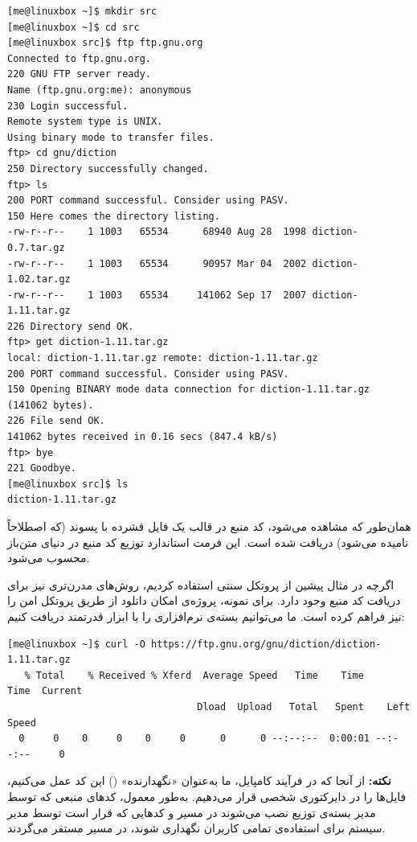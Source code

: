\begin{latin}
\begin{lstlisting}
[me@linuxbox ~]$ mkdir src
[me@linuxbox ~]$ cd src
[me@linuxbox src]$ ftp ftp.gnu.org
Connected to ftp.gnu.org.
220 GNU FTP server ready.
Name (ftp.gnu.org:me): anonymous
230 Login successful.
Remote system type is UNIX.
Using binary mode to transfer files.
ftp> cd gnu/diction
250 Directory successfully changed.
ftp> ls
200 PORT command successful. Consider using PASV.
150 Here comes the directory listing.
-rw-r--r--    1 1003   65534      68940 Aug 28  1998 diction-0.7.tar.gz
-rw-r--r--    1 1003   65534      90957 Mar 04  2002 diction-1.02.tar.gz
-rw-r--r--    1 1003   65534     141062 Sep 17  2007 diction-1.11.tar.gz
226 Directory send OK.
ftp> get diction-1.11.tar.gz
local: diction-1.11.tar.gz remote: diction-1.11.tar.gz
200 PORT command successful. Consider using PASV.
150 Opening BINARY mode data connection for diction-1.11.tar.gz (141062 bytes).
226 File send OK.
141062 bytes received in 0.16 secs (847.4 kB/s)
ftp> bye
221 Goodbye.
[me@linuxbox src]$ ls
diction-1.11.tar.gz
\end{lstlisting}
\end{latin}

همان‌طور که مشاهده می‌شود، کد منبع در قالب یک فایل فشرده با پسوند  (که اصطلاحاً  نامیده می‌شود) دریافت شده است. این فرمت استاندارد توزیع کد منبع در دنیای متن‌باز محسوب می‌شود.

اگرچه در مثال پیشین از پروتکل سنتی  استفاده کردیم، روش‌های مدرن‌تری نیز برای دریافت کد منبع وجود دارد. برای نمونه، پروژه‌ی  امکان دانلود از طریق پروتکل امن  را نیز فراهم کرده است. ما می‌توانیم بسته‌ی نرم‌افزاری  را با ابزار قدرتمند  دریافت کنیم:

\begin{latin}
\begin{lstlisting}
[me@linuxbox ~]$ curl -O https://ftp.gnu.org/gnu/diction/diction-1.11.tar.gz
   % Total    % Received % Xferd  Average Speed   Time    Time     Time  Current
                                 Dload  Upload   Total   Spent    Left  Speed
  0     0    0     0    0     0      0      0 --:--:--  0:00:01 --:--:--     0
\end{lstlisting}
\end{latin}

\begin{note}
\textbf{نکته:} از آنجا که در فرآیند کامپایل، ما به‌عنوان «نگهدارنده» () این کد عمل می‌کنیم، فایل‌ها را در دایرکتوری شخصی  قرار می‌دهیم. به‌طور معمول، کدهای منبعی که توسط مدیر بسته‌ی توزیع نصب می‌شوند در مسیر  و کدهایی که قرار است توسط مدیر سیستم برای استفاده‌ی تمامی کاربران نگهداری شوند، در مسیر  مستقر می‌گردند.
\end{note}

